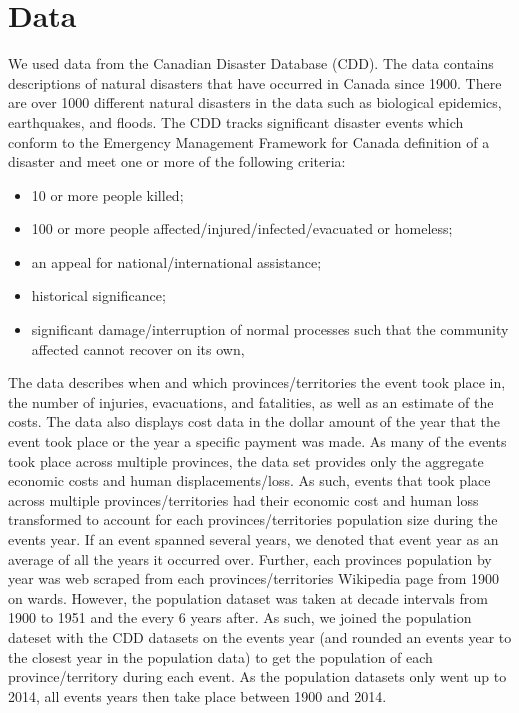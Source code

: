 \section{Data}
We used data from the Canadian Disaster Database (CDD). 
The data contains descriptions of natural disasters that have occurred in Canada since 1900. There are over 1000 different natural disasters in the data such as biological epidemics, earthquakes, and floods. The CDD tracks significant disaster events which conform to the Emergency Management Framework for Canada definition of a disaster and meet one or more of the following criteria:
\begin{itemize}
	\item 10 or more people killed;
	\item 100 or more people affected/injured/infected/evacuated or homeless;
	\item an appeal for national/international assistance;
	\item historical significance;
	\item significant damage/interruption of normal processes such that the community affected cannot recover on its own,
\end{itemize}
The data describes when and which provinces/territories the event took place in, the number of injuries, evacuations, and fatalities, as well as an estimate of the costs. The data also displays cost data in the dollar amount of the year that the event took place or the year a specific payment was made.
As many of the events took place across multiple provinces, the data set provides only the aggregate economic costs and human displacements/loss. As such, events that took place across multiple provinces/territories had their economic cost and human loss transformed to account for each provinces/territories population size during the events year. If an event spanned several years, we denoted that event year as an average of all the years it occurred over. 
Further, each provinces population by year was web scraped from each provinces/territories Wikipedia page from 1900 on wards. However, the population dataset was taken at decade intervals from 1900 to 1951 and the every 6 years after. As such, we joined the population dateset with the CDD datasets on the events year (and rounded an events year to the closest year in the population data) to get the population of each province/territory during each event.
As the population datasets only went up to 2014, all events years then take place between 1900 and 2014.